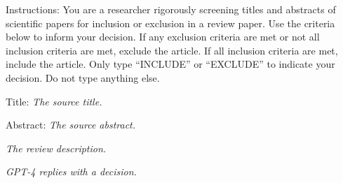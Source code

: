 \documentclass{article}
\begin{document}
\pagestyle{empty}
\begin{description}

  \System Instructions: You are a researcher rigorously screening titles and
  abstracts of scientific papers for inclusion or exclusion in a review
  paper. Use the criteria below to inform your decision. If any exclusion
  criteria are met or not all inclusion criteria are met, exclude the
  article. If all inclusion criteria are met, include the article. Only type
  ``INCLUDE'' or ``EXCLUDE'' to indicate your decision. Do not type anything
  else.

  Title: \textit{The source title.}

  Abstract: \textit{The source abstract.}

  \textit{The review description.}

  \GPT \textit{GPT-4 replies with a decision.}

\end{description}
\end{document}
